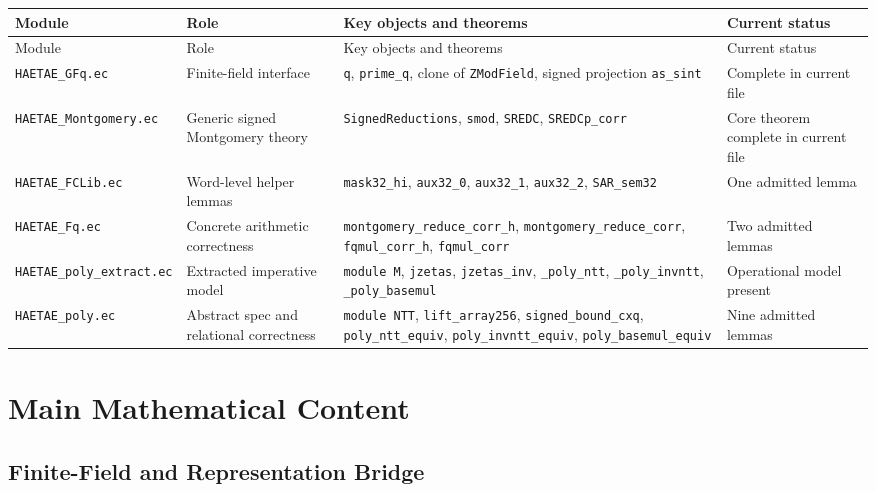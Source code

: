 \documentclass[11pt]{article}
\newcommand{\file}[1]{\texttt{#1}}
\newcommand{\ec}[1]{\texttt{#1}}
\begin{document}
\begin{longtable}{>{\raggedright\arraybackslash}p{}
                  >{\raggedright\arraybackslash}p{}
                  >{\raggedright\arraybackslash}p{}
                  >{\raggedright\arraybackslash}p{}}
\toprule
Module & Role & Key objects and theorems & Current status \\
\midrule
\endfirsthead
\toprule
Module & Role & Key objects and theorems & Current status \\
\midrule
\endhead
\file{HAETAE\_GFq.ec} &
Finite-field interface &
\ec{q}, \ec{prime\_q}, clone of \ec{ZModField}, signed projection
\ec{as\_sint} &
Complete in current file \\[0.4em]

\file{HAETAE\_Montgomery.ec} &
Generic signed Montgomery theory &
\ec{SignedReductions}, \ec{smod}, \ec{SREDC}, \ec{SREDCp\_corr} &
Core theorem complete in current file \\[0.4em]

\file{HAETAE\_FCLib.ec} &
Word-level helper lemmas &
\ec{mask32\_hi}, \ec{aux32\_0}, \ec{aux32\_1}, \ec{aux32\_2},
\ec{SAR\_sem32} &
One admitted lemma \\[0.4em]

\file{HAETAE\_Fq.ec} &
Concrete arithmetic correctness &
\ec{montgomery\_reduce\_corr\_h}, \ec{montgomery\_reduce\_corr},
\ec{fqmul\_corr\_h}, \ec{fqmul\_corr} &
Two admitted lemmas \\[0.4em]

\file{HAETAE\_poly\_extract.ec} &
Extracted imperative model &
\ec{module M}, \ec{jzetas}, \ec{jzetas\_inv}, \ec{\_poly\_ntt},
\ec{\_poly\_invntt}, \ec{\_poly\_basemul} &
Operational model present \\[0.4em]

\file{HAETAE\_poly.ec} &
Abstract spec and relational correctness &
\ec{module NTT}, \ec{lift\_array256}, \ec{signed\_bound\_cxq},
\ec{poly\_ntt\_equiv}, \ec{poly\_invntt\_equiv},
\ec{poly\_basemul\_equiv} &
Nine admitted lemmas \\
\bottomrule
\end{longtable}

\section{Main Mathematical Content}

\subsection{Finite-Field and Representation Bridge}
\end{document}
